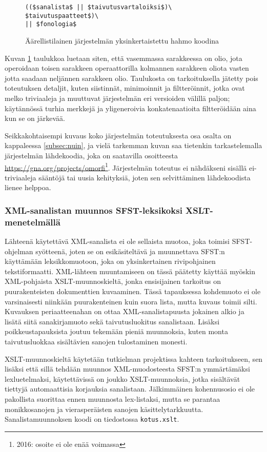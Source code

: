 \documentclass[free]{flammie}
\begin{document}
\begin{figure}
    \caption{Äärellistilainen järjestelmän yksinkertaistettu hahmo koodina
    \label{kuva:2}}
    \begin{verbatim}
(($sanalista$ || $taivutusvartaloiksi$)\
$taivutuspaatteet$)\
|| $fonologia$
    \end{verbatim}
\end{figure}


Kuvan \ref{kuva:2} taulukkoa luetaan siten, että vasemmassa sarakkeessa on olio, jota operoidaan toisen sarakkeen operaattorilla kolmannen sarakkeen oliota vasten jotta
saadaan neljännen sarakkeen olio. Taulukosta on tarkoituksella jätetty pois toteutuksen detaljit, kuten siistinnät, minimoinnit ja filtteröinnit, jotka ovat melko triviaaleja ja muuttuvat järjestelmän eri versioiden välillä paljon; käytännössä turhia
merkkejä ja yligeneroivia konkatenaatioita filtteröidään aina kun se on järkevää.

Seikkakohtaisempi kuvaus koko järjestelmän toteutuksesta osa osalta on
kappaleessa \ref{subsec:nuin}, ja vielä tarkemman kuvan saa tietenkin tarkastelemalla järjestelmän
lähdekoodia, joka on saatavilla osoitteesta
\url{https://gna.org/projects/omorfi}\footnote{2016: osoite ei ole enää voimassa}. Järjestelmän toteutus ei nähdäkseni sisällä ei-triviaaleja sääntöjä tai
uusia kehityksiä, joten sen selvittäminen lähdekoodista lienee helppoa.


\subsubsection{XML-sanalistan muunnos SFST-leksikoksi XSLT-menetelmällä}
\label{subsubsec:xslt}

Lähteenä käytettävä XML-sanalista ei ole sellaista muotoa, joka toimisi SFST-ohjelman syötteenä, joten se on esikäsiteltävä ja muunnettava SFST:n käyttämään
leksikkomuotoon, joka on yksinkertainen rivipohjainen tekstiformaatti.
XML-lähteen muuntamiseen on tässä päätetty käyttää myöskin XML-pohjaista XSLT-muunnoskieltä, jonka ensisijainen tarkoitus on puurakenteisten dokumenttien kuvaaminen. Tässä tapauksessa kohdemuoto ei ole varsinaisesti niinkään puurakenteinen kuin suora lista, mutta kuvaus toimii silti. Kuvauksen periaatteenahan
on ottaa XML-sanalistapuusta jokainen alkio ja lisätä siitä sanakirjamuoto sekä
taivutusluokitus sanalistaan. Lisäksi poikkeustapauksista joutuu tekemään pieniä
muunnoksia, kuten monta taivutusluokkaa sisältävien sanojen tulostaminen monesti.

XSLT-muunnoskieltä käytetään tutkielman projektissa kahteen tarkoitukseen, sen
lisäksi että sillä tehdään muunnos XML-muodosteesta SFST:n ymmärtämäksi lexluetelmaksi, käytettävissä on joukko XSLT-muunnoksia, jotka sisältävät tiettyjä
automaattisia korjauksia sanalistaan. Jälkimmäinen kohennusosio ei ole pakollista suorittaa ennen muunnosta lex-listaksi, mutta se parantaa monikkosanojen
ja vierasperäisten sanojen käsittelytarkkuutta. Sanalistamuunnoksen koodi on
tiedostossa \texttt{kotus.xslt}.
\end{document}
